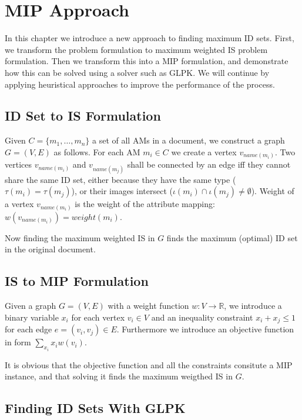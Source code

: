 \chapter{MIP Approach}
\label{chapter-mip}

In this chapter we introduce a new approach to finding maximum ID sets. First, we transform the problem formulation to maximum weighted IS problem formulation. Then we transform this into a MIP formulation, and demonstrate how this can be solved using a solver such as GLPK. 
We will continue by applying heuristical approaches to improve the performance of the process.

\section{ID Set to IS Formulation}

Given $C = \{m_1, \ldots, m_n\}$ a set of all AMs in a document, we construct a graph $G = (V,E)$ as follows. For each AM $m_i \in C$ we create a vertex $v_{name(m_i)}$. Two vertices $v_{name(m_i)}$ and $v_{name(m_j)}$ shall be connected by an edge iff they cannot share the same ID set, either because they have the same type ($\tau(m_i) = \tau(m_j)$), or their images intersect ($\iota(m_i) \cap \iota(m_j) \neq \emptyset$). Weight of a vertex $v_{name(m_i)}$ is the weight of the attribute mapping: $w(v_{name(m_i)}) = weight(m_i)$.

Now finding the maximum weighted IS in $G$ finds the maximum (optimal) ID set in the original document.

\section{IS to MIP Formulation}

Given a graph $G = (V,E)$ with a weight function $w: V \rightarrow \mathbb{R}$, we introduce a binary variable $x_i$ for each vertex $v_i \in V$ and an inequality constraint $x_i + x_j \leq 1$ for each edge $e = (v_i, v_j) \in E$. Furthermore we introduce an objective function in form $\sum_{x_i} x_i w(v_i)$.

It is obvious that the objective function and all the constraints consitute a MIP instance, and that solving it finds the maximum weigthed IS in $G$.

\section{Finding ID Sets With GLPK}

